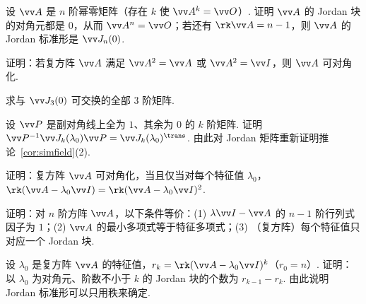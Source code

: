 {		\Bgroup
		\begin{exB}
			\item\label{ex:lam:B1} 设 $\vv A$ 是 $n$ 阶幂零矩阵（存在 $k$ 使 $\vv A^k=\vv O$）. 证明 $\vv A$ 的 Jordan 块的对角元都是 $0$，从而 $\vv A^n=\vv O$；若还有 $\rk\vv A=n-1$，则 $\vv A$ 的 Jordan 标准形是 $\vv J_n(0)$.
			\item\label{ex:lam:B2} 证明：若复方阵 $\vv A$ 满足 $\vv A^2=\vv A$ 或 $\vv A^2=\vv I$，则 $\vv A$ 可对角化.
			\item\label{ex:lam:B3} 求与 $\vv J_3(0)$ 可交换的全部 $3$ 阶矩阵.
			\item\label{ex:lam:B4} 设 $\vv P$ 是副对角线上全为 $1$、其余为 $0$ 的 $k$ 阶矩阵. 证明 $\vv P^{-1}\vv J_k(\lambda_0)\vv P=\vv J_k(\lambda_0)^\trans$. 由此对 Jordan 矩阵重新证明推论~\ref{cor:simfield}(2).
			\item\label{ex:lam:B5} 证明：复方阵 $\vv A$ 可对角化，当且仅当对每个特征值 $\lambda_0$，$\rk(\vv A-\lambda_0\vv I)=\rk(\vv A-\lambda_0\vv I)^2$.
			\item\label{ex:lam:B6} 证明：对 $n$ 阶方阵 $\vv A$，以下条件等价：(1) $\lambda\vv I-\vv A$ 的 $n-1$ 阶行列式因子为 $1$；(2) $\vv A$ 的最小多项式等于特征多项式；(3) （复方阵）每个特征值只对应一个 Jordan 块.
			\item\label{ex:lam:B7} 设 $\lambda_0$ 是复方阵 $\vv A$ 的特征值，$r_k=\rk(\vv A-\lambda_0\vv I)^k$（$r_0=n$）. 证明：以 $\lambda_0$ 为对角元、阶数不小于 $k$ 的 Jordan 块的个数为 $r_{k-1}-r_k$. 由此说明 Jordan 标准形可以只用秩来确定.
		\end{exB}
		
}
